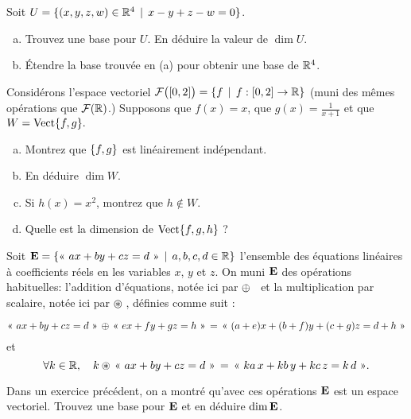 \begin{prob} \label{prob09.4} Soit $U=\set{(x,y,z,w) \in \R^4 \st x-y+z-w=0}$.\medskip
\begin{enumerate}[(a)]
\item Trouvez une base pour $U$. En d\'eduire la valeur de $\dim U$.


\item Étendre la base trouvée en (a) pour obtenir une base de $\R^4$. 
\end{enumerate}
 

\end{prob} \begin{prob} \label{prob09.5} Considérons l'espace vectoriel
$ \F\big([0,2]\big)=\set{f \st f : [0,2] \to \R}$ (muni des mêmes opérations que $\F(\R)$.) Supposons que $f(x)= x$,  
que $g(x)=\frac1{x+1}$ et que $W=\sp{f,g}.$

\begin{enumerate}[a)]
\item Montrez que $\set{f,g}$ est linéairement indépendant. 
\item En d\'eduire $\dim W$.
\item Si $h(x)=x^2$, montrez que $h\notin W$. 
\item Quelle est la dimension de $\sp{f,g,h}$ ?
\end{enumerate}


\end{prob} \begin{prob} \label{prob09.6} Soit $\E=\set{\text{«} \ ax+by+ cz=d\  \text{»}\st a,b,c, d\in\R}$ l'ensemble des équations linéaires à coefficients réels en les variables $x$, $y$ et $z$. On muni $\E$ des opérations habituelles: l'addition d'équations, notée ici par \og $\dsum$ \fg\ et la multiplication par scalaire, notée ici par \og $\circledast$ \fg, définies comme suit : 

$$\text{\text{«}} \ ax+by+ cz=d\  \text{»}\, \dsum\, \text{\text{«}}\ ex+fy+gz=h\ \text{»}\,=\,\text{\text{«}} \ (a+e)x + (b+f)y + (c+g)z=d+h\  \text{»} $$
et
$$ \forall k\in \R,\quad k\circledast \, \text{\text{«}}\  ax+by+ cz=d\ \text{»}\, = \,\text{\text{«}}\  ka\, x+ kb \,y+ kc \,z = k\,d\ \text{»}.$$

Dans un exercice précédent, on a montré qu'avec ces opérations $\E$ est un espace vectoriel. Trouvez une base pour $\E$ et en d\'eduire $ \dim \E$.
\end{prob}
